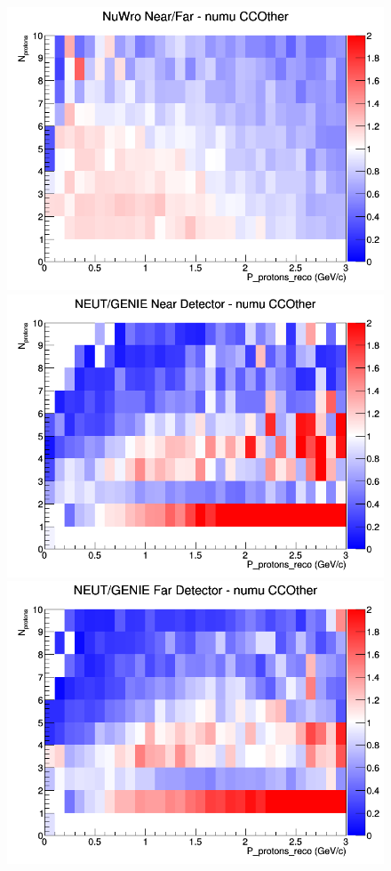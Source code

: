 \begin{figure}[h]
\endminipage
{}
\includegraphics[width=\linewidth]{eff_N_P/LAr/protons/ratios/CCOther_NuWro_numu_NF_N_P.png}
\endminipage
\newline
{}
\includegraphics[width=\linewidth]{eff_N_P/LAr/protons/ratios/CCOther_NEUT_GENIE_numu_near_N_P.png}
\endminipage
{}
\includegraphics[width=\linewidth]{eff_N_P/LAr/protons/ratios/CCOther_NEUT_GENIE_numu_far_N_P.png}

\end{figure}
